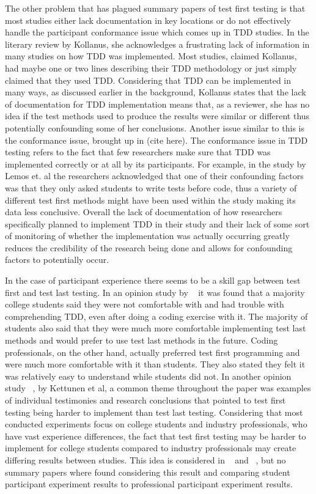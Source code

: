 \documentclass{sig-alternate}
\begin{document}
The other problem that has plagued summary papers of test first testing is that most studies either lack documentation in key locations or do not effectively handle the participant conformance issue which comes up in TDD studies.  In the literary review by Kollanus, she acknowledges a frustrating lack of information in many studies on how TDD was implemented.  Most studies, claimed Kollanus, had maybe one or two lines describing their TDD methodology or just simply claimed that they used TDD.  Considering that TDD can be implemented in many ways, as discussed earlier in the background, Kollanus states that the lack of documentation for TDD implementation means that, as a reviewer, she has no idea if the test methods used to produce the results were similar or different thus potentially confounding some of her conclusions.  Another issue similar to this is the conformance issue, brought up in (cite here).  The conformance issue in TDD testing refers to the fact that few researchers make sure that TDD was implemented correctly or at all by its participants.  For example, in the study by Lemos et. al the researchers acknowledged that one of their confounding factors was that they only asked students to write tests before code, thus a variety of different test first methods might have been used within the study making its data less conclusive.   Overall the lack of documentation of how researchers specifically planned to implement TDD in their study and their lack of some sort of monitoring of whether the implementation was actually occurring greatly reduces the credibility of the research being done and allows for confounding factors to potentially occur.

In the case of participant experience there seems to be a skill gap between test first and test last testing.  In an opinion study by ~\cite{Janzen:2007} it was found that a majority college students said they were not comfortable with and had trouble with comprehending TDD, even after doing a coding exercise with it.  The majority of students also said that they were much more comfortable implementing test last methods and would prefer to use test last methods in the future.  Coding professionals, on the other hand, actually preferred test first programming and were much more comfortable with it than students.  They also stated they felt it was relatively easy to understand while students did not. In another opinion study ~\cite{Kettunen:2010}, by Kettunen et al, a common theme throughout the paper was examples of individual testimonies and research conclusions that pointed to test first testing being harder to implement than test last testing.   Considering that most conducted experiments focus on college students and industry professionals, who have vast experience differences, the fact that test first testing may be harder to implement for college students compared to industry professionals may create differing results between studies.   This idea is considered in ~\cite{Hammond:2012} and ~\cite{Kettunen:2010}, but no summary papers where found considering this result and comparing student participant experiment results to professional participant experiment results.
\end{document}
